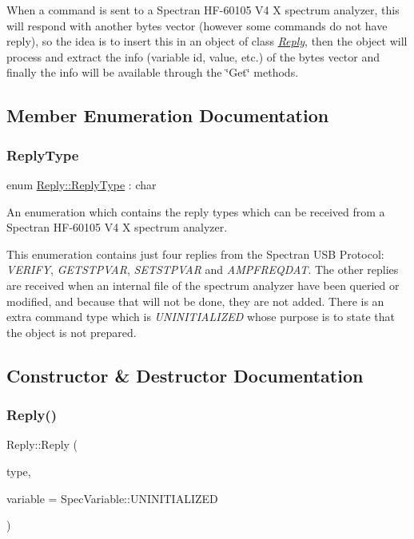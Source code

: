 When a command is sent to a Spectran H\+F-\/60105 V4 X spectrum analyzer, this will respond with another bytes vector (however some commands do not have reply), so the idea is to insert this in an object of class {\itshape \hyperlink{classReply}{Reply}}, then the object will process and extract the info (variable id, value, etc.) of the bytes vector and finally the info will be available through the \char`\"{}\+Get\char`\"{} methods. 

\subsection{Member Enumeration Documentation}
\mbox{\label{classReply_aa873dec4817ed08a5212ec3ba2b5c807}} 
\subsubsection{\texorpdfstring{Reply\+Type}{ReplyType}}
{\footnotesize\ttfamily enum \hyperlink{classReply_aa873dec4817ed08a5212ec3ba2b5c807}{Reply\+::\+Reply\+Type} \+: char}



An enumeration which contains the reply types which can be received from a Spectran H\+F-\/60105 V4 X spectrum analyzer. 

This enumeration contains just four replies from the Spectran U\+SB Protocol\+: {\itshape V\+E\+R\+I\+FY}, {\itshape G\+E\+T\+S\+T\+P\+V\+AR}, {\itshape S\+E\+T\+S\+T\+P\+V\+AR} and {\itshape A\+M\+P\+F\+R\+E\+Q\+D\+AT}. The other replies are received when an internal file of the spectrum analyzer have been queried or modified, and because that will not be done, they are not added. There is an extra command type which is {\itshape U\+N\+I\+N\+I\+T\+I\+A\+L\+I\+Z\+ED} whose purpose is to state that the object is not prepared. 

\subsection{Constructor \& Destructor Documentation}
\mbox{\label{classReply_a4c993ea22d3674d2a337b6ca157d2bea}} 
\subsubsection{\texorpdfstring{Reply()}{Reply()}\hspace{0.1cm}{\footnotesize\ttfamily [1/2]}}
{\footnotesize\ttfamily Reply\+::\+Reply (\begin{DoxyParamCaption}\item[{const \hyperlink{classReply_aa873dec4817ed08a5212ec3ba2b5c807}{Reply\+Type}}]{type,  }\item[{const \hyperlink{Spectran_8h_a0411392c90f0c8f0d8e44a4e94259276}{Spec\+Variable}}]{variable = {\ttfamily SpecVariable\+:\+:UNINITIALIZED} }\end{DoxyParamCaption})}



